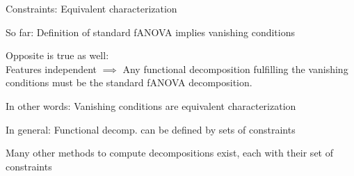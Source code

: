 \documentclass[10pt,compress,t,notes=noshow, xcolor=table]{beamer}
\begin{document}

    

\begin{framev}[align=top]{Constraints: Equivalent characterization}
\begin{itemizeM}
\item<+-> So far: Definition of standard fANOVA implies vanishing conditions
\item<+-> Opposite is true as well: \\
Features independent $\implies$ Any functional decomposition fulfilling the vanishing conditions must be the standard fANOVA decomposition.
\item<+-> In other words: Vanishing conditions are equivalent characterization
\item<+-> In general: Functional decomp. can be defined by sets of constraints \\
\item<+-> Many other methods to compute decompositions exist, each with their set of constraints
\end{itemizeM}
\end{framev}


    
    
    
    
    

     
\endlecture
\end{document}
